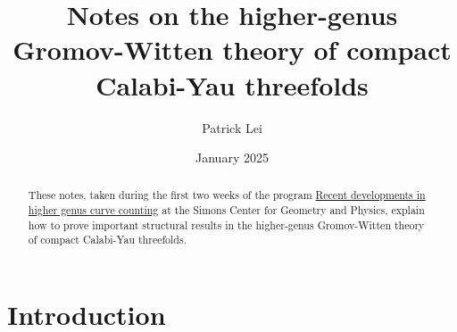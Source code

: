 \documentclass[10pt]{amsart}
\title[Higher-genus GW of compact CY3]{Notes on the higher-genus Gromov-Witten theory of compact Calabi-Yau threefolds}
\author{Patrick Lei}
\date{January 2025}
\theoremstyle{definition}
\theoremstyle{remark}
\theoremstyle{plain}
\theoremstyle{definition}
\theoremstyle{remark}
\newcommand{\1}{\mathbf{1}}
\newcommand{\2}{\mathbf{2}}
\newcommand{\3}{\mathbf{3}}
\begin{document}
    
\begin{abstract}
    These notes, taken during the first two weeks of the program \href{https://scgp.stonybrook.edu/archives/42649}{Recent developments in higher genus curve counting} at the Simons Center for Geometry and Physics, explain how to prove important structural results in the higher-genus Gromov-Witten theory of compact Calabi-Yau threefolds. 
\end{abstract}

\maketitle

\tableofcontents

\section{Introduction}%
\label{sec:Introduction}
\end{document}
